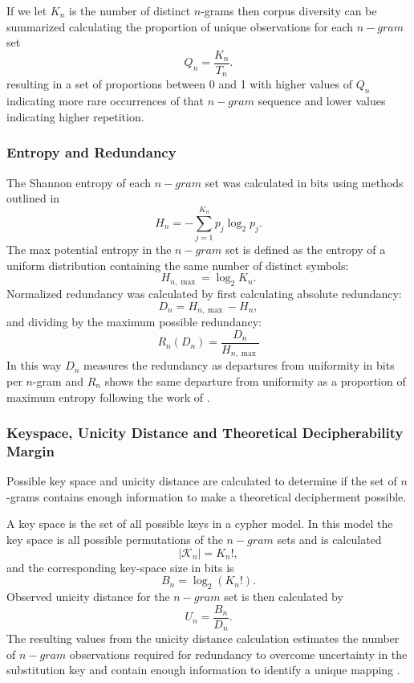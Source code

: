 \documentclass[preprint,12pt]{elsarticle}
\begin{document}
If we let \(K_n\) is the number of distinct \(n\)-grams then corpus diversity can be summarized calculating the proportion of unique observations for each \(n-gram\) set
\[
Q_n = \frac{K_n}{T_n}.
\]
resulting in a set of proportions between 0 and 1 with higher values of \(Q_n\) indicating more rare occurrences of that \(n-gram\) sequence and lower values indicating higher repetition. 

\subsubsection{Entropy and Redundancy}
The Shannon entropy of each \(n-gram\) set was calculated in bits using methods outlined in \cite{shannon1949_communication_secrecy}
\[
H_n = -\sum_{j=1}^{K_n} p_j \log_2 p_j.
\]
The max potential entropy in the \(n-gram\) set is defined as the entropy of a uniform distribution containing the same number of distinct symbols: 
\[
H_{n,\max} = \log_2 K_n.
\]
Normalized redundancy was calculated by first calculating absolute redundancy:
\[
D_n = H_{n,\max}-H_n,
\] and dividing by the maximum possible redundancy:
\[
R_n(D_n)=\frac{D_n}{H_{n,\max}}
\]
In this way \(D_n\) measures the redundancy as departures from uniformity in bits per \(n\)-gram and \(R_n\) shows the same departure from uniformity as a proportion of maximum entropy following the work of \cite{shannon1945_mathematical_cryptography}. 

\subsubsection{Keyspace, Unicity Distance and Theoretical Decipherability Margin}
Possible key space and unicity distance are calculated to determine if the set of \(n\)-grams contains enough information to make a theoretical decipherment possible. 

A key space is the set of all possible keys in a cypher model. In this model the key space is all possible permutations of the \(n-gram\) sets and is calculated 
\[
|\mathcal{K}_n| = K_n!,
\]and the corresponding key-space size in bits is
\[
B_n = \log_2(K_n!).
\]
Observed unicity distance for the \(n-gram\) set is then calculated by 
\[
U_n = \frac{B_n}{D_n}.
\]
The resulting values from the unicity distance calculation estimates the number of \(n-gram\) observations required for redundancy to overcome uncertainty in the substitution key and contain enough information to identify a unique mapping \cite{shannon1949_communication_secrecy}. 
\end{document}
